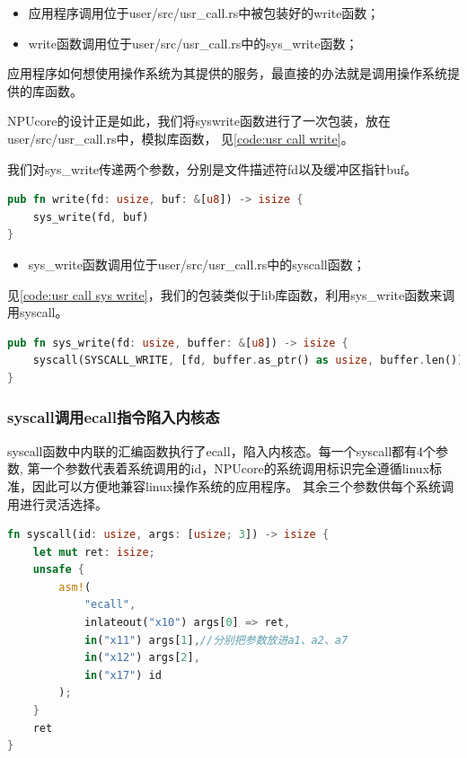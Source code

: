 \begin{itemize}
    \item 应用程序调用位于user/src/usr_call.rs中被包装好的write函数；
    \item write函数调用位于user/src/usr_call.rs中的sys_write函数；
\end{itemize}

应用程序如何想使用操作系统为其提供的服务，最直接的办法就是调用操作系统提供的库函数。

NPUcore的设计正是如此，我们将syswrite函数进行了一次包装，放在user/src/usr_call.rs中，模拟库函数，
见\autoref{code:usr call write}。

我们对sys_write传递两个参数，分别是文件描述符fd以及缓冲区指针buf。

\begin{lstlisting}[language={Rust}, label={code:usr call write},
    caption={usr_call.rs:write}]
pub fn write(fd: usize, buf: &[u8]) -> isize {
    sys_write(fd, buf)
}
\end{lstlisting}

\begin{itemize}
    \item sys_write函数调用位于user/src/usr_call.rs中的syscall函数；
\end{itemize}

见\autoref{code:usr call sys write}，我们的包装类似于lib库函数，利用sys_write函数来调用syscall。

\begin{lstlisting}[language={Rust}, label={code:usr call sys write},
    caption={usr_call.rs:sys_write}]
pub fn sys_write(fd: usize, buffer: &[u8]) -> isize {
    syscall(SYSCALL_WRITE, [fd, buffer.as_ptr() as usize, buffer.len()])
}
\end{lstlisting}

\subsubsection{syscall调用ecall指令陷入内核态}

syscall函数中内联的汇编函数执行了ecall，陷入内核态。每一个syscall都有4个参数,
第一个参数代表着系统调用的id，NPUcore的系统调用标识完全遵循linux标准，因此可以方便地兼容linux操作系统的应用程序。
其余三个参数供每个系统调用进行灵活选择。

\begin{lstlisting}[language={Rust}, label={code:syscall},
    caption={syscall}]
fn syscall(id: usize, args: [usize; 3]) -> isize {
    let mut ret: isize;
    unsafe {
        asm!(
            "ecall",
            inlateout("x10") args[0] => ret,
            in("x11") args[1],//分别把参数放进a1、a2、a7
            in("x12") args[2],
            in("x17") id
        );
    }
    ret
}
\end{lstlisting}

